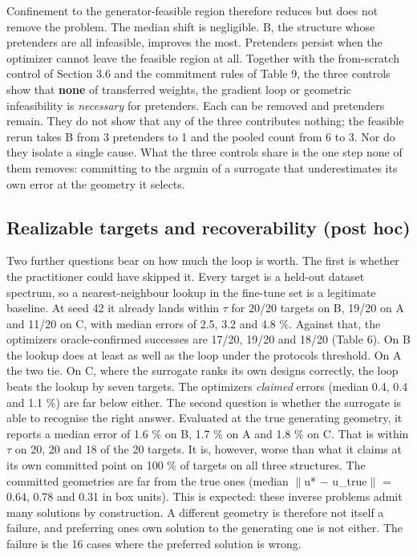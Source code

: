 \documentclass[11pt,a4paper]{article}
\newcounter{none}   %
\begin{document}
Confinement to the generator-feasible region therefore reduces but does not remove the
problem. The median shift is negligible. B, the structure whose pretenders are all
infeasible, improves the most. Pretenders persist when the optimizer cannot leave the
feasible region at all. Together with the from-scratch control of Section 3.6 and the
commitment rules of Table 9, the three controls show that \textbf{none} of transferred weights,
the gradient loop or geometric infeasibility is \emph{necessary} for pretenders. Each can be
removed and pretenders remain. They do not show that any of the three contributes nothing;
the feasible rerun takes B from 3 pretenders to 1 and the pooled count from 6 to 3. Nor do
they isolate a single cause. What the three controls share is the one step none of them
removes: committing to the argmin of a surrogate that underestimates its own error at the
geometry it selects.

\subsection{Realizable targets and recoverability (post hoc)}\label{sec:3.9}

Two further questions bear on how much the loop is worth. The first is whether the
practitioner could have skipped it. Every target is a held-out dataset spectrum, so a
nearest-neighbour lookup in the fine-tune set is a legitimate baseline. At seed 42 it
already lands within \ensuremath{\tau} for 20/20 targets on B, 19/20 on A and 11/20 on C, with median
errors of 2.5, 3.2 and 4.8 \%. Against that, the optimizer\textquotesingle s oracle-confirmed successes are
17/20, 19/20 and 18/20 (Table 6). On B the lookup does at least as well as the loop under
the protocol\textquotesingle s threshold. On A the two tie. On C, where the surrogate ranks its own designs
correctly, the loop beats the lookup by seven targets. The optimizer\textquotesingle s \emph{claimed} errors
(median 0.4, 0.4 and 1.1 \%) are far below either. The second question is whether the
surrogate is able to recognise the right answer. Evaluated at the true generating
geometry, it reports a median error of 1.6 \% on B, 1.7 \% on A and 1.8 \% on C. That is
within \ensuremath{\tau} on 20, 20 and 18 of the 20 targets. It is, however, worse than what it claims at
its own committed point on 100 \% of targets on all three structures. The committed
geometries are far from the true ones (median \ensuremath{\|}u* \ensuremath{-} u\_true\ensuremath{\|} = 0.64, 0.78 and 0.31 in box
units). This is expected: these inverse problems admit many solutions by construction. A
different geometry is therefore not itself a failure, and preferring one\textquotesingle s own solution to
the generating one is not either. The failure is the 16 cases where the preferred
solution is wrong.
\end{document}
